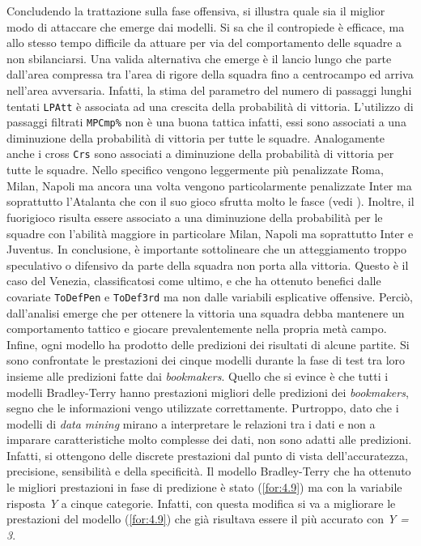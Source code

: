 Concludendo la trattazione sulla fase offensiva, si illustra quale sia il miglior modo di attaccare che emerge dai modelli. Si sa che il contropiede è efficace, ma allo stesso tempo difficile da attuare per via del comportamento delle squadre a non sbilanciarsi. Una valida alternativa che emerge è il lancio lungo che parte dall'area compressa tra l'area di rigore della squadra fino a centrocampo ed arriva nell'area avversaria. Infatti, la stima del parametro del numero di passaggi lunghi tentati \texttt{LPAtt} è associata ad una crescita della probabilità di vittoria. L'utilizzo di passaggi filtrati \texttt{MPCmp\%} non è una buona tattica infatti, essi sono associati a una diminuzione della probabilità di vittoria per tutte le squadre. Analogamente anche i cross \texttt{Crs} sono associati a diminuzione della probabilità di vittoria per tutte le squadre. Nello specifico vengono leggermente più penalizzate Roma, Milan, Napoli ma ancora una volta vengono particolarmente penalizzate Inter ma soprattutto l'Atalanta che con il suo gioco sfrutta molto le fasce (vedi \textit{\cite{ataGioco}}). Inoltre, il fuorigioco risulta essere associato a una diminuzione della probabilità per le squadre con l'abilità maggiore in particolare Milan, Napoli ma soprattutto Inter e Juventus. In conclusione, è importante sottolineare che un atteggiamento troppo speculativo o difensivo da parte della squadra non porta alla vittoria. Questo è il caso del Venezia, classificatosi come ultimo, e che ha ottenuto benefici dalle covariate \texttt{ToDefPen} e \texttt{ToDef3rd} ma non dalle variabili esplicative offensive. Perciò, dall'analisi emerge che per ottenere la vittoria una squadra debba mantenere un comportamento tattico e giocare prevalentemente nella propria metà campo.\\
Infine, ogni modello ha prodotto delle predizioni dei risultati di alcune partite. Si sono confrontate le prestazioni dei cinque modelli durante la fase di test tra loro insieme alle predizioni fatte dai \emph{bookmakers}. Quello che si evince è che tutti i modelli Bradley-Terry hanno prestazioni migliori delle predizioni dei \emph{bookmakers}, segno che le informazioni vengo utilizzate correttamente. Purtroppo, dato che i modelli di \emph{data mining} mirano a interpretare le relazioni tra i dati e non a imparare caratteristiche molto complesse dei dati, non sono adatti alle predizioni. Infatti, si ottengono delle discrete prestazioni dal punto di vista dell'accuratezza, precisione, sensibilità e della specificità. Il modello Bradley-Terry che ha ottenuto le migliori prestazioni in fase di predizione è stato (\ref{for:4.9}) ma con la variabile risposta \emph{Y} a cinque categorie. Infatti, con questa modifica si va a migliorare le prestazioni del modello (\ref{for:4.9}) che già risultava essere il più accurato con \emph{Y = 3}.
